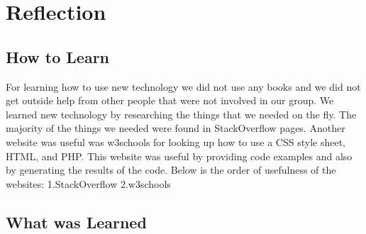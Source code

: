 \documentclass[letterpaper,10pt,serif,draftclsnofoot,onecolumn,compsoc,titlepage]{IEEEtran}
\begin{document}
\section{Reflection}
\subsection{How to Learn}
For learning how to use new technology we did not use any books and we did not get outside help from other people that were not involved in our group.
We learned new technology by researching the things that we needed on the fly.
The majority of the things we needed were found in StackOverflow pages.
Another website was useful was w3schools for looking up how to use a CSS style sheet, HTML, and PHP.
This website was useful by providing code examples and also by generating the results of the code. 
Below is the order of usefulness of the websites:
1.StackOverflow
2.w3schools
\subsection{What was Learned}




%
%
\begin{appendices}

\end{appendices}
\end{document}
